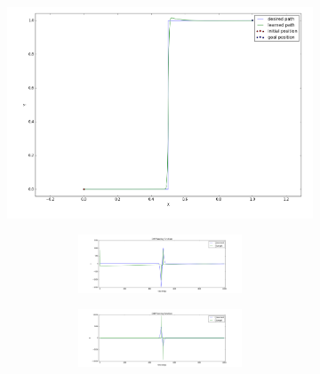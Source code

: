 \documentclass{beamer}
\begin{document}
	\begin{frame}
		\begin{figure}
			\begin{subfigure}[b]{0.38\linewidth}
				\includegraphics[scale=0.15]{images/step_f.png}
			\end{subfigure}
			\begin{subfigure}[b]{0.60\linewidth}
				\begin{figure}
					\begin{subfigure}[b]{0.5\linewidth}
						\includegraphics[scale=0.15]{images/f_x.png}
					\end{subfigure}
					\begin{subfigure}[b]{0.5\linewidth}
						\includegraphics[scale=0.15]{images/f_y.png}
					\end{subfigure}	
				\end{figure}

			\end{subfigure}	
		\end{figure}
	\end{frame}
	
\end{document}
